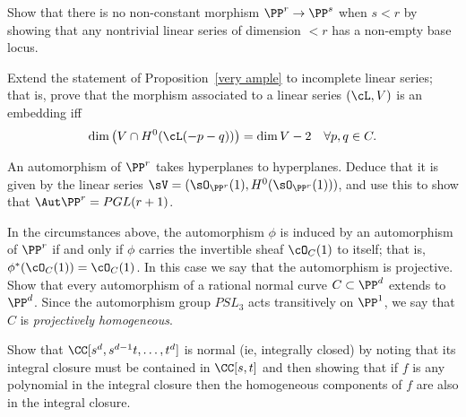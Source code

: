 \begin{exercise}\label{here there be basepoints}
 Show that there is no non-constant morphism $\PP^r\to \PP^s$ when $s<r$ by showing that any nontrivial linear
 series of dimension $<r$ has a non-empty base locus.
\end{exercise}

\begin{exercise}
Extend the statement of Proposition~\ref{very ample} to incomplete linear series; that is, prove that the morphism associated to a linear series $(\cL, V)$ is an embedding iff
$$
\dim\big( V \cap H^0(\cL(-p-q))\big) = \dim V - 2 \quad \forall p, q \in C.
$$
\end{exercise}

\begin{exercise}
An automorphism of $\PP^r$ takes hyperplanes to hyperplanes. Deduce that it is given by the linear series
$\sV = (\sO_{\PP^r}(1), H^0(\sO_{\PP^r}(1)))$, and use this to show that $\Aut \PP^r = PGL(r+1)$. 
\end{exercise}

\begin{exercise}\label{projective automorphism}
In the circumstances above, the automorphism $\phi$ is induced by an automorphism of $\PP^r$ if and only if $\phi$ carries the invertible sheaf $\cO_{C}(1)$ to itself; that is, $\phi^*(\cO_{C}(1)) = \cO_{C}(1)$. In this case we say that the automorphism
is projective. Show that every automorphism of a rational normal curve $C \subset \PP^d$  extends to $\PP^d$. Since the
automorphism group $PSL_3$ acts transitively on $\PP^1$, we say that
$C$ is \emph{projectively homogeneous}.


\end{exercise}

\begin{exercise}\label{normality of RNC}
 Show that $\CC[s^d,s^{d-1}t,\dots, t^d]$ is normal (ie, integrally closed) by noting that its integral closure must be
 contained in $\CC[s,t]$ and then showing that if $f$ is any polynomial
 in the integral closure then the homogeneous components of $f$ are also in the integral closure.
\end{exercise}



